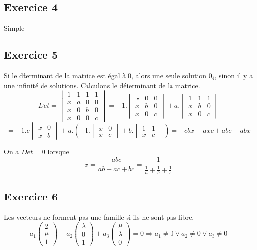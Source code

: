 \documentclass[]{book}
\theoremstyle{definition}
\begin{document}
\subsection*{Exercice 4}
Simple

\subsection*{Exercice 5}
Si le d\'terminant de la matrice est \'egal \`a 0, alors une seule solution $0_4$, sinon il y a une infinit\'e de solutions. Calculons le d\'eterminant de la matrice.
$$
Det = \begin{vmatrix} 1 & 1 & 1 & 1 \\ x & a & 0 & 0 \\ x & 0 & b & 0 \\ x & 0 & 0 & c\end{vmatrix} = 
-1.\begin{vmatrix}  x & 0 & 0 \\ x & b & 0 \\ x & 0 & c \end{vmatrix} + a.\begin{vmatrix}  1 & 1 & 1 \\ x & b & 0 \\ x & 0 & c \end{vmatrix}
$$
$$
= -1.c\begin{vmatrix}  x & 0 \\ x & b \end{vmatrix} + a.\left(-1.\begin{vmatrix}  x & 0 \\ x & c \end{vmatrix} + b.\begin{vmatrix}  1 & 1 \\ x & c \end{vmatrix}\right) =
-cbx - axc + abc -abx
$$

On a $Det=0$ lorsque
$$
x = \frac{abc}{ab+ac+bc} = \frac{1}{\frac{1}{a}+\frac{1}{b}+\frac{1}{c}}
$$

\subsection*{Exercice 6}
Les vecteurs ne forment pas une famille si ils ne sont pas libre.
$$
a_1\begin{pmatrix}2\\\mu\\1\end{pmatrix} + a_2\begin{pmatrix}\lambda \\ 0 \\1 \end{pmatrix} + a_3\begin{pmatrix}\mu\\\lambda\\0\end{pmatrix} = 0
\Rightarrow a_1 \neq 0 \lor a_2 \neq 0 \lor a_3 \neq 0$$
\end{document}
